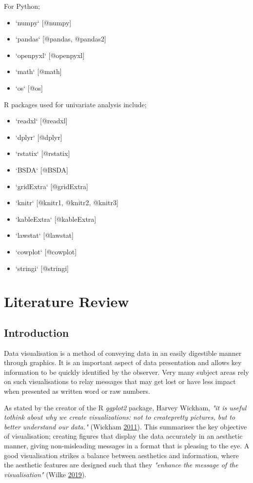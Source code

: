 \documentclass[
  11pt,
]{book}
\begin{document}
For Python;

\begin{itemize}
   \item `numpy` [@numpy]
   \item `pandas` [@pandas, @pandas2]
   \item `openpyxl` [@openpyxl]
   \item `math` [@math]
   \item `os` [@os]
\end{itemize}

R packages used for univariate analysis include;

\begin{itemize}
   \item `readxl` [@readxl]
   \item `dplyr` [@dplyr]
   \item `rstatix` [@rstatix]
   \item `BSDA` [@BSDA]
   \item `gridExtra` [@gridExtra]
   \item `knitr` [@knitr1, @knitr2, @knitr3]
   \item `kableExtra` [@kableExtra]
   \item `lawstat` [@lawstat]
   \item `cowplot` [@cowplot]
   \item `stringi` [@stringi]
\end{itemize}

\centering

\raggedright

\clearpage

\tableofcontents

\chapter{Literature Review}

\section{Introduction}

Data visualisation is a method of conveying data in an easily digestible
manner through graphics. It is an important aspect of data presentation
and allows key information to be quickly identified by the observer.
Very many subject areas rely on such visualisations to relay messages
that may get lost or have less impact when presented as written word or
raw numbers.

As stated by the creator of the R \textit{ggplot2} package, Harvey
Wickham,
\textit{"it is useful tothink about why we create visualizations: not to createpretty pictures, but to better understand our data."}
(Wickham \protect\hyperlink{ref-ggplot2}{2011}). This summarises the key
objective of visualisation; creating figures that display the data
accurately in an aesthetic manner, giving non-misleading messages in a
format that is pleasing to the eye. A good visualisation strikes a
balance between aesthetics and information, where the aesthetic features
are designed such that they
\textit{"enhance the message of the visualisation"} (Wilke
\protect\hyperlink{ref-wilke2019}{2019}).
\end{document}
